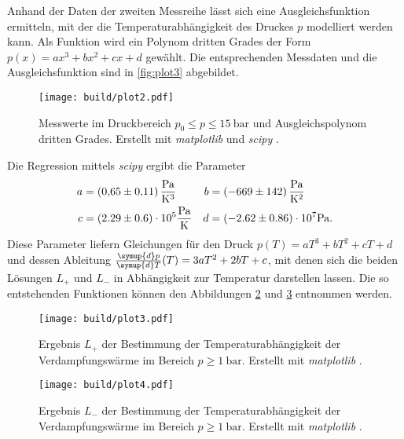 Anhand der Daten der zweiten Messreihe lässt sich eine Ausgleichsfunktion ermitteln, mit der die Temperaturabhängigkeit des Druckes $p$ modelliert werden kann.
Als Funktion wird ein Polynom dritten Grades der Form $p(x) = ax^3 + bx^2 + cx + d$ gewählt. Die entsprechenden Messdaten und die Ausgleichsfunktion sind
in \autoref{fig:plot3} abgebildet. 

\begin{figure}
    \centering
    \texttt{[image: build/plot2.pdf]}
    \caption{Messwerte im Druckbereich $p_0 \leq p \leq \qty{15}{\bar}$ und Ausgleichspolynom dritten Grades. Erstellt mit 
    \textit{matplotlib} \cite{matplotlib} und \textit{scipy} \cite{scipy}.}
    \label{fig:plot2}
\end{figure}

Die Regression mittels \textit{scipy} \cite{scipy} ergibt die Parameter
\begin{align*}
    a &= \qty{0.65 +- 0.11}{\pascal\per\cubic\kelvin} & b &= \qty{-669 +- 142}{\pascal\per\kelvin\squared} \\
    c &= (2.29 \pm 0.6) \cdot 10^5 \unit{\pascal\per\kelvin}     & d &= (-2.62 \pm 0.86) \cdot 10^7 \unit{\pascal}. \\ 
\end{align*}
Diese Parameter liefern Gleichungen für den Druck $p(T) = aT^3 + bT^2 + cT + d$ und dessen Ableitung $\frac{\symup{d}p}{\symup{d}T}(T) = 3aT^2 + 2bT + c$, mit denen 
sich die beiden Lösungen $L_+$ und $L_-$ in Abhängigkeit zur Temperatur darstellen lassen. Die so entstehenden Funktionen können den Abbildungen \ref{fig:plot3} und 
\ref{fig:plot4} entnommen werden.

\begin{figure}
    \centering
    \texttt{[image: build/plot3.pdf]}
    \caption{Ergebnis $L_+$ der Bestimmung der Temperaturabhängigkeit der Verdampfungswärme im Bereich $p \geq \qty{1}{\bar}$. Erstellt mit \textit{matplotlib} \cite{matplotlib}.}
    \label{fig:plot3}
\end{figure}

\begin{figure}
    \centering
    \texttt{[image: build/plot4.pdf]}
    \caption{Ergebnis $L_-$ der Bestimmung der Temperaturabhängigkeit der Verdampfungswärme im Bereich $p \geq \qty{1}{\bar}$. Erstellt mit \textit{matplotlib} \cite{matplotlib}.}
    \label{fig:plot4}
\end{figure}
